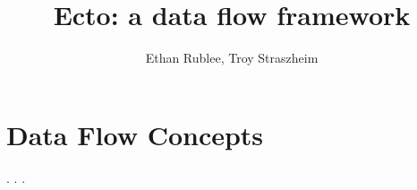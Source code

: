 \documentclass[10pt,a4paper]{article}
\author{Ethan Rublee, Troy Straszheim}
\title{Ecto: a data flow framework}
\date{}
\begin{document}
\maketitle
\section{Data Flow Concepts}
\cite{dennis}.
\cite{formal_flow}.
\cite{sdf}.
\cite{dataflow_process_networks}



\end{document}
